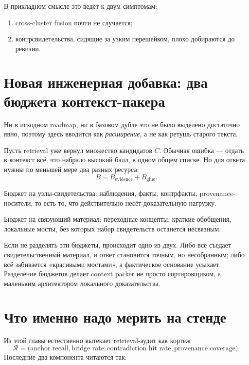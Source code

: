 В прикладном смысле это ведёт к двум симптомам:
\begin{enumerate}
\item cross-cluster fusion почти не случается;
\item контрсвидетельства, сидящие за узким перешейком, плохо добираются до ревизии.
\end{enumerate}

\section{Новая инженерная добавка: два бюджета контекст-пакера}
\label{sec:dualbudget}

Ни в исходном roadmap, ни в базовом дубле это не было выделено достаточно явно,
поэтому здесь вводится как \emph{расширение}, а не как ретушь старого текста.

Пусть retrieval уже вернул множество кандидатов $C$. Обычная ошибка — отдать в
контекст всё, что набрало высокий балл, в одном общем списке. Но для ответа нужны
по меньшей мере два разных ресурса:
\[
B = B_{\mathrm{evidence}} + B_{\mathrm{glue}}.
\]

\begin{definition}
Бюджет на узлы-свидетельства: наблюдения, факты, контрфакты, provenance-носители,
то есть то, что действительно несёт доказательную нагрузку.
\end{definition}

\begin{definition}
Бюджет на связующий материал: переходные концепты, краткие обобщения, локальные
мосты, без которых набор свидетельств останется несвязным.
\end{definition}

Если не разделять эти бюджеты, происходит одно из двух. Либо всё съедает
свидетельственный материал, и ответ становится точным, но несобранным; либо всё
забивается «красивыми мостами», а фактическое основание усыхает. Разделение
бюджетов делает context packer не просто сортировщиком, а маленьким архитектором
локального доказательства.

\section{Что именно надо мерить на стенде}

Из этой главы естественно вытекает retrieval-аудит как кортеж
\[
\mathcal{R}
=
\bigl(
\text{anchor recall},
\text{bridge rate},
\text{contradiction hit rate},
\text{provenance coverage}
\bigr).
\]
Последние два компонента читаются так:

